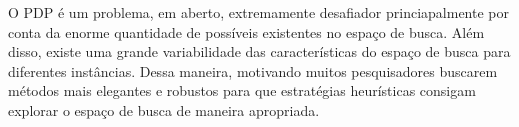 O PDP é um problema, em aberto,  extremamente desafiador princiapalmente por conta da enorme quantidade de possíveis existentes no espaço de busca. Além disso, existe uma grande variabilidade das características do espaço de busca para diferentes instâncias. Dessa maneira,  motivando muitos pesquisadores buscarem métodos mais elegantes e robustos para que estratégias heurísticas consigam explorar o espaço de busca de maneira apropriada.



